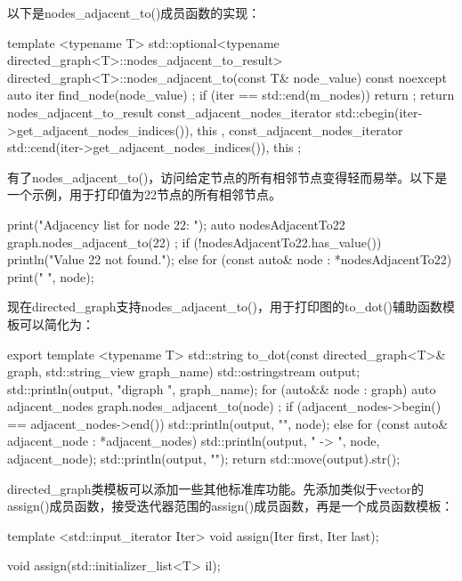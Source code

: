以下是nodes\_adjacent\_to()成员函数的实现：

\begin{cpp}
template <typename T>
std::optional<typename directed_graph<T>::nodes_adjacent_to_result>
    directed_graph<T>::nodes_adjacent_to(const T& node_value) const noexcept
{
    auto iter { find_node(node_value) };
    if (iter == std::end(m_nodes)) { return {}; }
    return nodes_adjacent_to_result {
        const_adjacent_nodes_iterator {
            std::cbegin(iter->get_adjacent_nodes_indices()), this },
        const_adjacent_nodes_iterator {
            std::cend(iter->get_adjacent_nodes_indices()), this }
    };
}
\end{cpp}

有了nodes\_adjacent\_to()，访问给定节点的所有相邻节点变得轻而易举。以下是一个示例，用于打印值为22节点的所有相邻节点。

\begin{cpp}
print("Adjacency list for node 22: ");
auto nodesAdjacentTo22 { graph.nodes_adjacent_to(22) };
if (!nodesAdjacentTo22.has_value()) {
    println("Value 22 not found.");
} else {
    for (const auto& node : *nodesAdjacentTo22) { print("{} ", node); }
}
\end{cpp}


现在directed\_graph支持nodes\_adjacent\_to()，用于打印图的to\_dot()辅助函数模板可以简化为：

\begin{cpp}
export template <typename T>
std::string to_dot(const directed_graph<T>& graph, std::string_view graph_name)
{
    std::ostringstream output;
    std::println(output, "digraph {} {{", graph_name);
    for (auto&& node : graph) {
        auto adjacent_nodes { graph.nodes_adjacent_to(node) };
        if (adjacent_nodes->begin() == adjacent_nodes->end()) {
            std::println(output, "{}", node);
        } else {
            for (const auto& adjacent_node : *adjacent_nodes) {
                std::println(output, "{} -> {}", node, adjacent_node);
            }
        }
    }
    std::println(output, "}}");
    return std::move(output).str();
}
\end{cpp}


directed\_graph类模板可以添加一些其他标准库功能。先添加类似于vector的assign()成员函数，接受迭代器范围的assign()成员函数，再是一个成员函数模板：

\begin{cpp}
template <std::input_iterator Iter>
void assign(Iter first, Iter last);

void assign(std::initializer_list<T> il);
\end{cpp}

